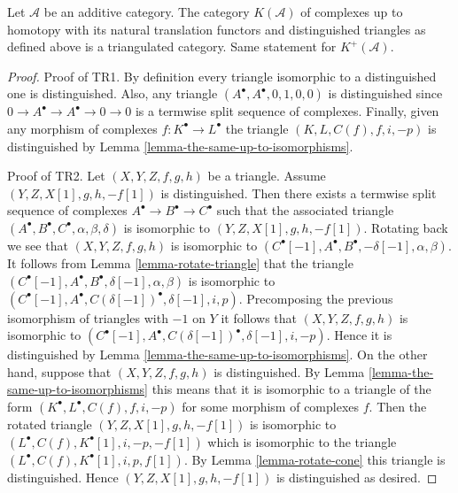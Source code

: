 \begin{proposition}
\label{proposition-homotopy-category-triangulated}
Let $\mathcal{A}$ be an additive category.
The category $K(\mathcal{A})$ of complexes up to
homotopy with its natural translation functors
and distinguished triangles as defined above
is a triangulated category. Same statement for
$K^{+}(\mathcal{A})$.
\end{proposition}

\begin{proof}
Proof of TR1. By definition every triangle isomorphic to a distinguished
one is distinguished. Also, any triangle $(A^\bullet, A^\bullet, 0, 1, 0, 0)$
is distinguished since $0 \to A^\bullet \to A^\bullet \to 0 \to 0$ is
a termwise split sequence of complexes. Finally, given any morphism of
complexes $f : K^\bullet \to L^\bullet$ the triangle
$(K, L, C(f), f, i, -p)$ is distinguished by
Lemma \ref{lemma-the-same-up-to-isomorphisms}.

\medskip\noindent
Proof of TR2. Let $(X, Y, Z, f, g, h)$ be a triangle.
Assume $(Y, Z, X[1], g, h, -f[1])$ is distinguished.
Then there exists a termwise split sequence of complexes
$A^\bullet \to B^\bullet \to C^\bullet$ such that the associated
triangle $(A^\bullet, B^\bullet, C^\bullet, \alpha, \beta, \delta)$
is isomorphic to $(Y, Z, X[1], g, h, -f[1])$. Rotating back we see
that $(X, Y, Z, f, g, h)$ is isomorphic to
$(C^\bullet[-1], A^\bullet, B^\bullet, -\delta[-1], \alpha, \beta)$.
It follows from Lemma \ref{lemma-rotate-triangle} that the triangle
$(C^\bullet[-1], A^\bullet, B^\bullet, \delta[-1], \alpha, \beta)$
is isomorphic to
$(C^\bullet[-1], A^\bullet, C(\delta[-1])^\bullet, \delta[-1], i, p)$.
Precomposing the previous isomorphism of triangles with $-1$ on $Y$
it follows that $(X, Y, Z, f, g, h)$ is isomorphic to
$(C^\bullet[-1], A^\bullet, C(\delta[-1])^\bullet, \delta[-1], i, -p)$.
Hence it is distinguished by
Lemma \ref{lemma-the-same-up-to-isomorphisms}.
On the other hand, suppose that $(X, Y, Z, f, g, h)$ is distinguished.
By Lemma \ref{lemma-the-same-up-to-isomorphisms} this means that it is
isomorphic to a triangle of the form
$(K^\bullet, L^\bullet, C(f), f, i, -p)$ for some morphism of
complexes $f$. Then the rotated triangle $(Y, Z, X[1], g, h, -f[1])$ is
isomorphic to $(L^\bullet, C(f), K^\bullet[1], i, -p, -f[1])$ which is
isomorphic to the triangle $(L^\bullet, C(f), K^\bullet[1], i, p, f[1])$.
By Lemma \ref{lemma-rotate-cone} this triangle is distinguished.
Hence $(Y, Z, X[1], g, h, -f[1])$ is distinguished as desired.


\end{proof}
